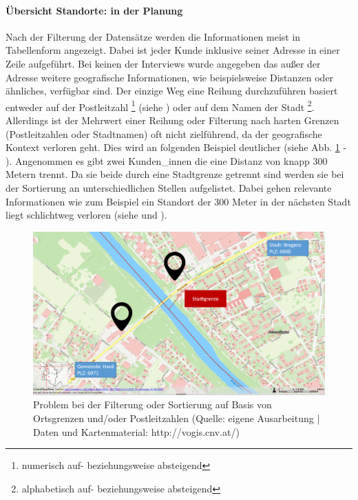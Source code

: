 \documentclass[Bachelorarbeit.tex]{subfiles}
\begin{document}
\paragraph{Übersicht Standorte: in der Planung}
Nach der Filterung der Datensätze werden die Informationen meist in Tabellenform angezeigt.
Dabei ist jeder Kunde inklusive seiner Adresse in einer Zeile aufgeführt.
Bei keinen der Interviews wurde angegeben das außer der Adresse weitere geografische Informationen, wie beispielsweise Distanzen oder ähnliches, verfügbar sind.
Der einzige Weg eine Reihung durchzuführen basiert entweder auf der Postleitzahl
\footnote{
	numerisch auf- beziehungsweise absteigend
	} 
(siehe ) oder auf dem Namen der Stadt
\footnote{
	alphabetisch auf- beziehungsweise absteigend
	}. 
Allerdings ist der Mehrwert einer Reihung oder Filterung nach harten Grenzen (Postleitzahlen oder Stadtnamen) oft nicht zielführend, da der geografische Kontext verloren geht.
Dies wird an folgenden Beispiel deutlicher (siehe Abb. \ref{fig:HarteGrenzen} -  ). 
Angenommen es gibt zwei Kunden\_innen die eine Distanz von knapp 300 Metern trennt. 
Da sie beide durch eine Stadtgrenze getrennt sind werden sie bei der Sortierung an unterschiedlichen Stellen aufgelistet.
Dabei gehen relevante Informationen wie zum Beispiel ein Standort der 300 Meter in der nächsten Stadt liegt schlichtweg verloren (siehe  und ). 
 
\begin{figure}[h]
\centering
\includegraphics[width=1\linewidth]{img/Interviews/HarteGrenzen}
\caption[Probleme mit harten Grenzen]{Problem bei der Filterung oder Sortierung auf Basis von Ortsgrenzen und/oder Postleitzahlen (Quelle: eigene Ausarbeitung | Daten und Kartenmaterial: http://vogis.cnv.at/)}
\label{fig:HarteGrenzen}
\end{figure}
\end{document}
